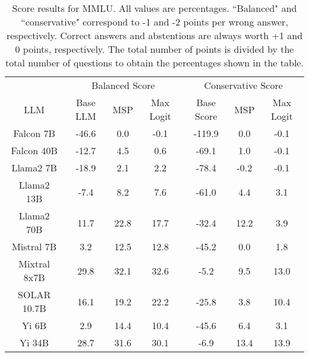 \renewcommand\arraystretch{1.2}
\begin{table*}
\centering
\begin{tabular}{c|c|c|c|c|c|c}
& \multicolumn{3}{c|}{Balanced Score} & \multicolumn{3}{c}{Conservative Score} \\ 
LLM & Base LLM & MSP & Max Logit & Base Score & MSP & Max Logit\\ \hline
Falcon 7B & -46.6 & 0.0 & -0.1 & -119.9 & 0.0 & -0.1\\
Falcon 40B & -12.7 & 4.5 & 0.6 & -69.1 & 1.0 & -0.1\\
Llama2 7B & -18.9 & 2.1 & 2.2 & -78.4 & -0.2 & -0.1\\
Llama2 13B & -7.4 & 8.2 & 7.6 & -61.0 & 4.4 & 3.1\\
Llama2 70B & 11.7 & 22.8 & 17.7 & -32.4 & 12.2 & 3.9\\
Mistral 7B & 3.2 & 12.5 & 12.8 & -45.2 & 0.0 & 1.8\\
Mixtral 8x7B & 29.8 & 32.1 & 32.6 & -5.2 & 9.5 & 13.0\\
SOLAR 10.7B & 16.1 & 19.2 & 22.2 & -25.8 & 3.8 & 10.4\\
Yi 6B & 2.9 & 14.4 & 10.4 & -45.6 & 6.4 & 3.1\\
Yi 34B & 28.7 & 31.6 & 30.1 & -6.9 & 13.4 & 13.9\\
\hline
\end{tabular}
\caption{Score results for MMLU. All values are percentages. ``Balanced" and ``conservative" correspond to -1 and -2 points per wrong answer, respectively. Correct answers and abstentions are always worth +1 and 0 points, respectively. The total number of points is divided by the total number of questions to obtain the percentages shown in the table.}
\label{tab:mmlu_score}
\end{table*}
